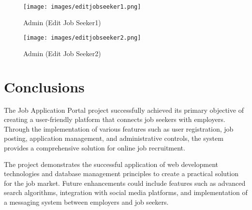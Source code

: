 \documentclass[a4paper,12pt]{article}
\begin{document}
\begin{figure}[h!]
    \centering
    \texttt{[image: images/editjobseeker1.png]}
    \caption{Admin (Edit Job Seeker1)}
    \label{fig:admin_editJobSeeker1}
\end{figure}


\begin{figure}[h!]
    \centering
    \texttt{[image: images/editjobseeker2.png]}
    \caption{Admin (Edit Job Seeker2)}
    \label{fig:admin_editJobSeeker2}
\end{figure}

\newpage

\section{Conclusions}
The Job Application Portal project successfully achieved its primary objective of creating a user-friendly platform that connects job seekers with employers. Through the implementation of various features such as user registration, job posting, application management, and administrative controls, the system provides a comprehensive solution for online job recruitment.

The project demonstrates the successful application of web development technologies and database management principles to create a practical solution for the job market. Future enhancements could include features such as advanced search algorithms, integration with social media platforms, and implementation of a messaging system between employers and job seekers.
\end{document}
